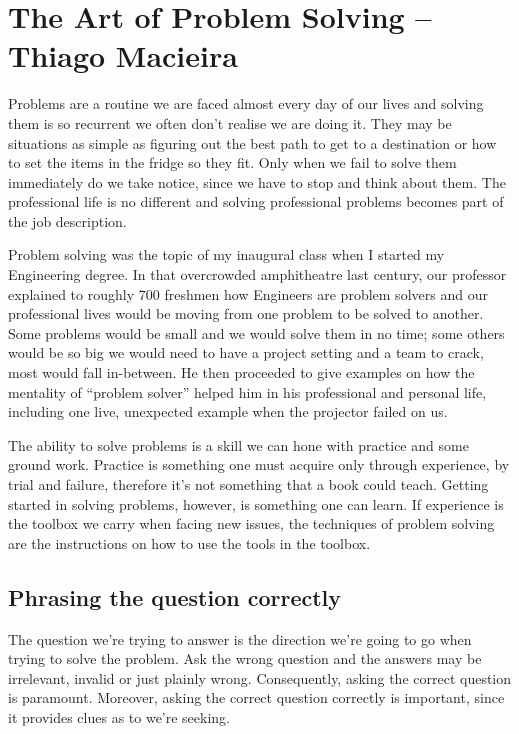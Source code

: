 \chapter{The Art of Problem Solving -- Thiago Macieira}

Problems are a routine we are faced almost every day of our lives and solving them is so recurrent we often don’t realise we are doing it. They may be situations as simple as figuring out the best path to get to a destination or how to set the items in the fridge so they fit. Only when we fail to solve them immediately do we take notice, since we have to stop and think about them. The professional life is no different and solving professional problems becomes part of the job description.

Problem solving was the topic of my inaugural class when I started my Engineering degree. In that overcrowded amphitheatre last century, our professor explained to roughly 700 freshmen how Engineers are problem solvers and our professional lives would be moving from one problem to be solved to another. Some problems would be small and we would solve them in no time; some others would be so big we would need to have a project setting and a team to crack, most would fall in-between. He then proceeded to give examples on how the mentality of “problem solver” helped him in his professional and personal life, including one live, unexpected example when the projector failed on us.

The ability to solve problems is a skill we can hone with practice and some ground work. Practice is something one must acquire only through experience, by trial and failure, therefore it’s not something that a book could teach. Getting started in solving problems, however, is something one can learn. If experience is the toolbox we carry when facing new issues, the techniques of problem solving are the instructions on how to use the tools in the toolbox.

\section*{Phrasing the question correctly}

The question we’re trying to answer is the direction we’re going to go when trying to solve the problem. Ask the wrong question and the answers may be irrelevant, invalid or just plainly wrong. Consequently, asking the correct question is paramount. Moreover, asking the correct question correctly is important, since it provides clues as to we’re seeking.

